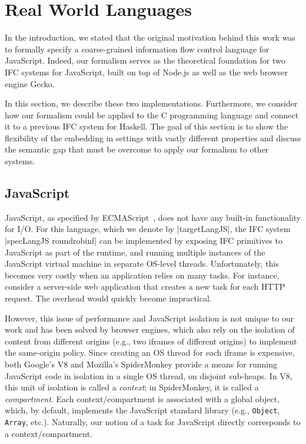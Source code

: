 \section{Real World Languages}
\label{sec:real}

In the introduction, we stated that the original motivation behind
this work was to formally specify a
coarse-grained information flow control language for JavaScript.
%
Indeed, our formalism serves as the theoretical foundation for two
IFC systems for JavaScript, built on top of Node.js as well as
the web browser engine Gecko.

In this section, we describe these two implementations.  Furthermore,
we consider how our formalism could be applied to the C programming
language and connect it to a previous IFC system for Haskell.
%
The goal of this section is to show the flexibility of the embedding in settings with
vastly different properties and discuss the
semantic gap that must be overcome to apply our formalism
to other systems.
%


\subsection{JavaScript}
\label{sec:real:js}

JavaScript, as specified by
ECMAScript~\cite{ecma}, does not have any built-in
functionality for I/O.
%
For this language, which we denote by |targetLangJS|, the IFC system
|specLangJS roundrobinf| can be implemented by exposing IFC primitives
to JavaScript as part of the runtime, and running multiple instances
of the JavaScript virtual machine in separate OS-level threads.
%
Unfortunately, this becomes very costly when an application relies on
many tasks.
%
For instance, consider a server-side web application that
creates a new task for each HTTP request.  The overhead would
quickly become impractical.

However, this issue of performance and JavaScript isolation is not
unique to our work and has been solved by browser engines,
which also
rely on the isolation of content from
different origins (e.g., two iframes of different origins) to
implement the same-origin policy.
%
Since creating an OS thread for each iframe is expensive, both
Google's V8 and Mozilla's SpiderMonkey provide a means for running
JavaScript code in isolation in a single OS thread,
on disjoint sub-heaps.
%
In V8, this unit of isolation is called a \emph{context}; in
SpiderMonkey, it is called a \emph{compartment}.
%
Each context/compartment is associated with a global object, which, by
default, implements the JavaScript standard library (e.g.,
\verb|Object|, \verb|Array|, etc.).
%
Naturally, our notion of a task for JavaScript directly corresponds to
a context/compartment.


